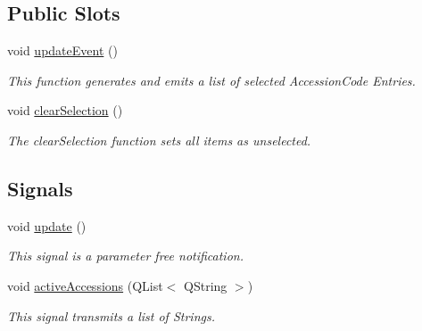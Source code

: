 \subsection*{Public Slots}
\begin{DoxyCompactItemize}
\item 
void \mbox{\hyperlink{class_protein_view_af352ac170651ea7d1ed401200a14c2c8}{update\+Event}} ()
\begin{DoxyCompactList}\small\item\em This function generates and emits a list of selected Accession\+Code Entries. \end{DoxyCompactList}\item 
void \mbox{\hyperlink{class_protein_view_ae025e7252521425bff32a5656877add0}{clear\+Selection}} ()
\begin{DoxyCompactList}\small\item\em The clear\+Selection function sets all items as unselected. \end{DoxyCompactList}\end{DoxyCompactItemize}
\subsection*{Signals}
\begin{DoxyCompactItemize}
\item 
\mbox{\label{class_protein_view_a373eab90a586e782397fb033ab052cc1}} 
void \mbox{\hyperlink{class_protein_view_a373eab90a586e782397fb033ab052cc1}{update}} ()
\begin{DoxyCompactList}\small\item\em This signal is a parameter free notification. \end{DoxyCompactList}\item 
\mbox{\label{class_protein_view_aea998af0dc44d2636dab2f8bdba07a66}} 
void \mbox{\hyperlink{class_protein_view_aea998af0dc44d2636dab2f8bdba07a66}{active\+Accessions}} (Q\+List$<$ Q\+String $>$)
\begin{DoxyCompactList}\small\item\em This signal transmits a list of Strings. \end{DoxyCompactList}\end{DoxyCompactItemize}
